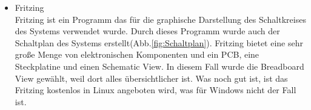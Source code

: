 \begin{itemize}
		\item Fritzing \\
		Fritzing ist ein Programm das für die graphische Darstellung des Schaltkreises des Systems verwendet wurde. Durch dieses Programm wurde auch der Schaltplan des Systems erstellt(Abb.\ref{fig:Schaltplan}). Fritzing bietet eine sehr große Menge von elektronischen Komponenten und ein PCB, eine Steckplatine und einen Schematic View. In diesem Fall wurde die Breadboard View gewählt, weil dort alles übersichtlicher ist. Was noch gut ist, ist das Fritzing kostenlos in Linux angeboten wird, was für Windows nicht der Fall ist.\cite{Fritzing}
\end{itemize}	
	
